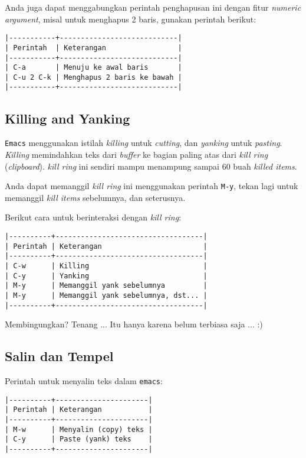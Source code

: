 \documentclass{article}
\begin{document}
Anda juga dapat menggabungkan perintah penghapusan ini dengan fitur
\emph{numeric argument}, misal untuk menghapus 2 baris, gunakan perintah 
berikut:

\begin{verbatim}
|-----------+----------------------------|
| Perintah  | Keterangan                 |
|-----------+----------------------------|
| C-a       | Menuju ke awal baris       |
| C-u 2 C-k | Menghapus 2 baris ke bawah |
|-----------+----------------------------|
\end{verbatim}

\subsection{Killing and Yanking}
\verb=Emacs= menggunakan istilah \emph{killing} untuk \emph{cutting}, dan
\emph{yanking} untuk \emph{pasting}. \emph{Killing} memindahkan teks dari
\emph{buffer} ke bagian paling atas dari \emph{kill ring} (\emph{clipboard}).
\emph{kill ring} ini sendiri mampu menampung sampai 60 buah \emph{killed items}.

Anda dapat memanggil \emph{kill ring} ini menggunakan perintah \verb=M-y=, 
tekan lagi untuk memanggil \emph{kill items} sebelumnya, dan seterusnya.

Berikut cara untuk berinteraksi dengan \emph{kill ring}:

\begin{verbatim}
|----------+-----------------------------------|
| Perintah | Keterangan                        |
|----------+-----------------------------------|
| C-w      | Killing                           |
| C-y      | Yanking                           |
| M-y      | Memanggil yank sebelumnya         |
| M-y      | Memanggil yank sebelumnya, dst... |
|----------+-----------------------------------|
\end{verbatim}

Membingungkan? Tenang ... Itu hanya karena belum terbiasa saja ... :)

\subsection{Salin dan Tempel}

Perintah untuk menyalin teks dalam \verb=emacs=:

\begin{verbatim}
|----------+----------------------|
| Perintah | Keterangan           |
|----------+----------------------|
| M-w      | Menyalin (copy) teks |
| C-y      | Paste (yank) teks    |
|----------+----------------------|
\end{verbatim}
\end{document}
